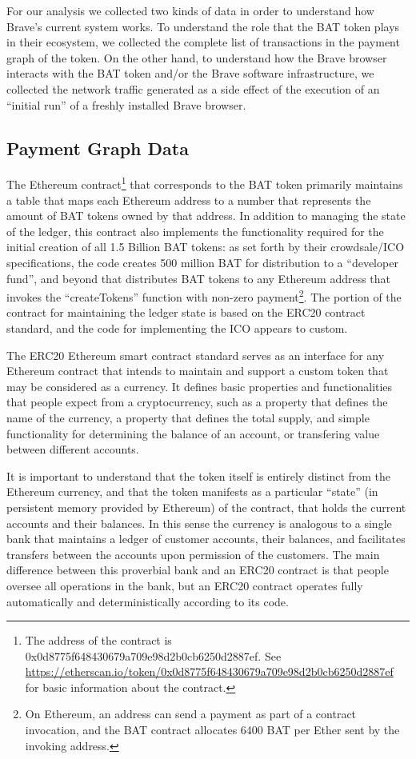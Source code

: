 \documentclass[sigconf]{acmart}
\begin{document}
For our analysis we collected two kinds of data
in order to understand how Brave's current
system works.
To understand the role that the BAT token plays
in their ecosystem, we collected 
the complete list of transactions in the
payment graph of the token.
On the other hand, to understand how
the Brave browser interacts with the BAT
token and/or the Brave software infrastructure,
we collected the network traffic generated
as a side effect of the execution of
an ``initial run'' of a freshly
installed Brave browser.

\subsection{Payment Graph Data}
The Ethereum contract\footnote{The address of the contract is 0x0d8775f648430679a709e98d2b0cb6250d2887ef.
See \url{https://etherscan.io/token/0x0d8775f648430679a709e98d2b0cb6250d2887ef} for basic information
about the contract.} that corresponds to the BAT token
primarily maintains a
table that maps each Ethereum address
to a number that represents the amount of BAT tokens
owned by that address.
In addition to managing the state of the ledger,
this contract also implements the functionality
required for the initial creation of all 1.5 Billion
BAT tokens: as set 
forth by their crowdsale/ICO specifications\cite{BAT-wp},
the code creates 500 million BAT for distribution to a
``developer fund'', and beyond that
distributes BAT tokens to any Ethereum
address that invokes the ``createTokens''
function with non-zero
payment\footnote{On Ethereum, an address can
send a payment as part of a contract invocation,
and the BAT contract allocates 6400 BAT
per Ether sent by the invoking address.}.
The portion of the contract for maintaining
the ledger state is based on the ERC20
contract standard\cite{ERC20}, and the code
for implementing the ICO appears to custom.

The ERC20 Ethereum smart contract standard serves
as an interface for any Ethereum contract
that intends to maintain and support a
custom token that may be considered as a currency.
It defines basic properties and functionalities
that people expect
from a cryptocurrency,
such as a property that defines the name of the currency,
a property that defines the total supply,
and simple functionality for determining the balance
of an account, or transfering value between different accounts.

It is important to understand that the token itself is
entirely distinct from the Ethereum currency, and
that the token manifests as a particular ``state''
(in persistent memory provided by Ethereum) of the
contract, that holds the current accounts and their balances.
In this sense the currency is analogous to a single
bank that maintains a ledger of customer accounts,
their balances, and facilitates transfers between the 
accounts upon permission of the customers. The main
difference between this proverbial bank and an ERC20
contract is that people oversee all operations in the
bank, but an ERC20 contract operates fully automatically
and deterministically according to its code.
\end{document}
